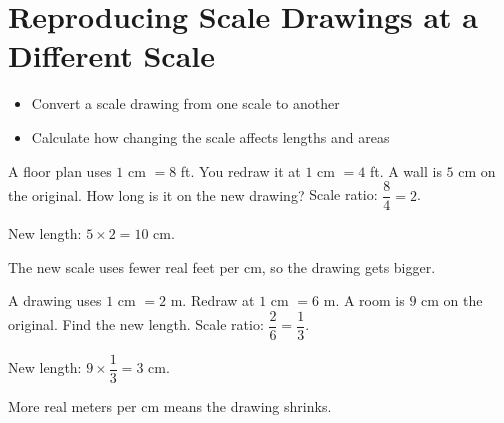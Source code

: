 \section{Reproducing Scale Drawings at a Different Scale}

\begin{stepGoal}
\begin{itemize}
    \item Convert a scale drawing from one scale to another
    \item Calculate how changing the scale affects lengths and areas
\end{itemize}
\end{stepGoal}

\begin{stepVocabBox}
\end{stepVocabBox}

\begin{stepsCard}
\end{stepsCard}

\begin{stepExample}{A floor plan uses $1$ cm $= 8$ ft. You redraw it at $1$ cm $= 4$ ft. A wall is $5$ cm on the original. How long is it on the new drawing?}
     Scale ratio: $\dfrac{8}{4} = 2$.

     New length: $5 \times 2 = 10$ cm.

     The new scale uses fewer real feet per cm, so the drawing gets bigger. \checkmark
\end{stepExample}

\begin{stepExample}{A drawing uses $1$ cm $= 2$ m. Redraw at $1$ cm $= 6$ m. A room is $9$ cm on the original. Find the new length.}
     Scale ratio: $\dfrac{2}{6} = \dfrac{1}{3}$.

     New length: $9 \times \dfrac{1}{3} = 3$ cm.

     More real meters per cm means the drawing shrinks. \checkmark
\end{stepExample}

